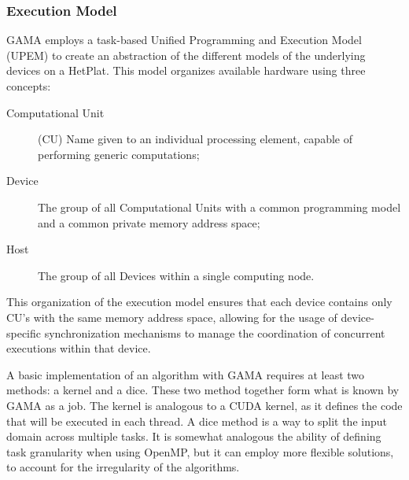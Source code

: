 \subsubsection{Execution Model}

GAMA employs a task-based Unified Programming and Execution Model (UPEM) to create an abstraction of the different models of the underlying devices on a HetPlat. This model organizes available hardware using three concepts:

\begin{description}
  \item[Computational Unit] (CU) Name given to an individual processing element, capable of performing generic computations;

  \item[Device] The group of all Computational Units with a common programming model and a common private memory address space;

  \item[Host] The group of all Devices within a single computing node.
\end{description}

This organization of the execution model ensures that each device contains only CU's with the same memory address space, allowing for the usage of device-specific synchronization mechanisms to manage the coordination of concurrent executions within that device.

A basic implementation of an algorithm with GAMA requires at least two methods: a kernel and a dice. These two method together form what is known by GAMA as a job. The kernel is analogous to a CUDA kernel, as it defines the code that will be executed in each thread. A dice method is a way to split the input domain across multiple tasks. It is somewhat analogous the ability of defining task granularity when using OpenMP, but it can employ more flexible solutions, to account for the irregularity of the algorithms.
